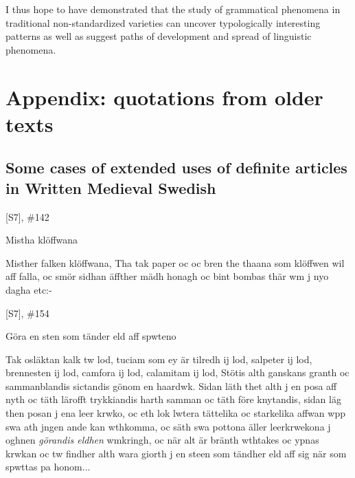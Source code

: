 I thus hope to have demonstrated that the study of grammatical phenomena in traditional non-standardized varieties can uncover typologically interesting patterns as well as suggest paths of development and spread of linguistic phenomena. 

\section{Appendix: quotations from older texts}
\subsection[Some cases of extended uses of definite articles in Written Medieval Swedish]{Some cases of extended uses of definite articles in Written Medieval Swedish}
[S7], \#142


Mistha klöffwana


Misther falken klöffwana, Tha tak paper oc  oc bren the thaana som klöffwen wil aff falla, oc smör sidhan äffther mädh honagh oc bint bombas thär wm j nyo dagha etc:-

[S7], \#154


Göra en sten som tänder eld aff spwteno 


Tak osläktan kalk tw lod, tuciam som ey är tilredh ij lod, salpeter ij lod, brennesten ij lod, camfora ij lod, calamitam ij lod, Stötis alth ganskans granth oc sammanblandis sictandis gönom en haardwk. Sidan läth thet alth j en posa aff nyth oc täth lärofft trykkiandis harth samman oc täth före knytandis, sidan läg then posan j ena leer krwko, oc eth lok lwtera tättelika oc starkelika affwan wpp swa ath jngen ande kan wthkomma, oc säth swa pottona äller leerkrwekona j oghnen \textit{görandis eldhen} wmkringh, oc när alt är bränth wthtakes oc ypnas krwkan oc tw findher alth wara giorth j en steen som tändher eld aff sig när som spwttas pa honom...

